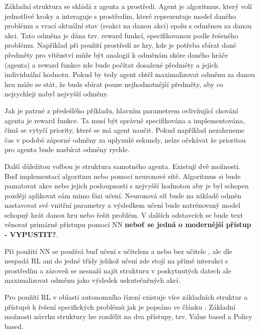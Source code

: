 \documentclass[czech, bc, kky, he, iso690alph]{fasthesis}
\begin{document}
            Základní struktura se skládá z agenta a prostředí. Agent je algoritmus, který volí jednotlivé kroky a interaguje s prostředím, které reprezentuje model daného problému a vrací aktuální stav (reakci na danou akci) spolu s odměnou za danou akci. Tato odměna je dána tzv. reward funkcí, specifikovanou podle řešeného problému. Například při použití prostředí ze hry, kde je potřeba sbírat dané předměty pro vítězství může být analogií k odměnám skóre daného hráče (agenta) a reward funkce zde bude počítat dosažené předměty a jejich individuální hodnotu. Pokud by tedy agent chtěl maximalizovat odměnu za danou hru může se stát, že bude sbírat pouze nejhodnotnější předměty, aby co nejrychleji nabyl nejvyšší odměny.
            
            Jak je patrné z předešlého příkladu, hlavním parametrem ovlivňující chování agenta je reward funkce. Ta musí být správně specifikována a implementována, čímž se vytyčí priority, které se má agent naučit. Pokud například nezahrneme čas v podobě záporné odměny za uplynulé sekundy, nelze očekávat že prioritou pro agenta bude nasbírat odměny rychle.
            
            Další důležitou volbou je struktura samotného agenta. Existují dvě možnosti. Buď implementací algoritmu nebo pomocí neuronové sítě. Algoritmus si bude pamatovat akce nebo jejich posloupnosti s nejvyšší hodnotou aby je byl schopen později aplikovat sám mimo fázi učení. Neuronová síť bude na základě odměn nastavovat své vnitřní parametry a výsledkem učení bude natrénovaný model schopný hrát danou hru nebo řešit problém. V dalších odstavcích se bude text věnovat primárně přístupu pomocí NN\textbf{ neboť se jedná o modernější přístup - VYPUSTIT?}.
            
            Při použití NN se používá buď učení s učitelem a nebo bez učitele , ale dle \cite[p.~2]{RLbook} nespadá RL ani do jedné třídy jelikož učení zde stojí na přímé interakci s prostředím a zároveň se nesnaží najít strukturu v poskytnutých datech ale maximalizovat odměnu jako výsledek uskutečněných akcí.
            
            Pro použití RL v oblasti autonomního řízení existuje více základních struktur a přístupů k řešení specifických problémů jak je popsáno ve článku \cite{Deep_RL_survey}. Základní možnosti návrhu struktury lze rozdělit na dva přístupy, tzv. Value based a Policy based.
            
\end{document}
